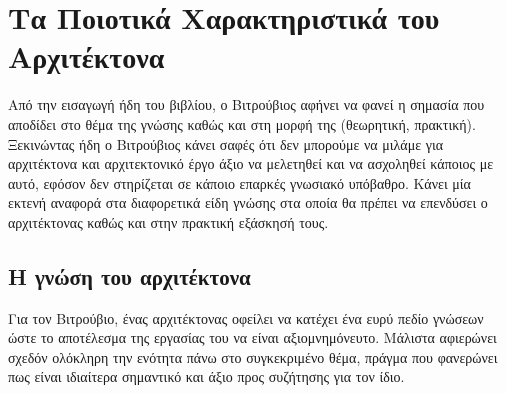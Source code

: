 \section{Τα Ποιοτικά Χαρακτηριστικά του Αρχιτέκτονα}

Από την εισαγωγή ήδη του βιβλίου, ο Βιτρούβιος αφήνει να φανεί η σημασία που αποδίδει στο θέμα της γνώσης καθώς και στη μορφή της (θεωρητική, πρακτική). Ξεκινώντας ήδη ο Βιτρούβιος κάνει σαφές ότι δεν μπορούμε να μιλάμε για αρχιτέκτονα και αρχιτεκτονικό έργο άξιο να μελετηθεί και να ασχοληθεί κάποιος με αυτό, εφόσον δεν στηρίζεται σε κάποιο επαρκές γνωσιακό υπόβαθρο. Κάνει μία εκτενή αναφορά στα διαφορετικά είδη γνώσης στα οποία θα πρέπει να επενδύσει ο αρχιτέκτονας καθώς και στην πρακτική εξάσκησή τους.


\subsection{Η γνώση του αρχιτέκτονα}

Για τον Βιτρούβιο, ένας αρχιτέκτονας οφείλει να κατέχει ένα ευρύ πεδίο γνώσεων 
ώστε το αποτέλεσμα της εργασίας του να είναι αξιομνημόνευτο. Μάλιστα αφιερώνει 
σχεδόν ολόκληρη την ενότητα πάνω στο συγκεκριμένο θέμα, πράγμα που φανερώνει 
πως είναι ιδιαίτερα σημαντικό και άξιο προς συζήτησης για τον ίδιο.

